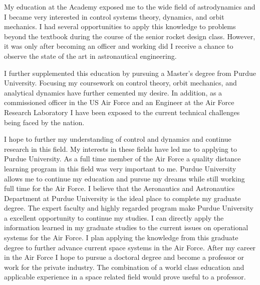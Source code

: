 \documentclass[12pt, oneside]{article}   	%
\begin{document}


My education at the Academy exposed me to the wide field of astrodynamics and I became very interested in control systems theory, dynamics, and orbit mechanics.
I had several opportunities to apply this knowledge to problems beyond the textbook during the course of the senior rocket design class.
However, it was only after becoming an officer and working did I receive a chance to observe the state of the art in astronautical engineering.

I further supplemented this education by pursuing a Master's degree from Purdue University. 
Focusing my coursework on control theory, orbit mechanics, and analytical dynamics have further cemented my desire.
In addition, as a commissioned officer in the US Air Force and an Engineer at the Air Force Research Laboratory I have been exposed to the current technical challenges being faced by the nation.

I hope to further my understanding of control and dynamics and continue research in this field.    
My interests in these fields have led me to applying to Purdue University.  
As a full time member of the Air Force a quality distance learning program in this field was very important to me.  
Purdue University allows me to continue my education and pursue my dreams while still working full time for the Air Force.  
I believe that the Aeronautics and Astronautics Department at Purdue University is the ideal place to complete my graduate degree. 
The expert faculty and highly regarded program make Purdue University a excellent opportunity to continue my studies.  
I can directly apply the information learned in my graduate studies to the current issues on operational systems for the Air Force. 
I plan applying the knowledge from this graduate degree to further advance current space systems in the Air Force.  
After my career in the Air Force I hope to pursue a doctoral degree and become a professor or work for the private industry.  
The combination of a world class education and applicable experience in a space related field would prove useful to a professor.      


\end{document}
